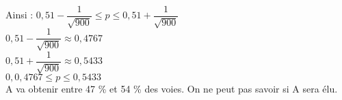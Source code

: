 Ainsi : $ 0,51 - \dfrac{1}{\sqrt{900}} \leq p \leq 0,51 + \dfrac{1}{\sqrt{900}} $ \\

$ 0,51 - \dfrac{1}{\sqrt{900}} \approx 0,4767 $ \\

$ 0,51 + \dfrac{1}{\sqrt{900}} \approx 0,5433 $ \\

$ 0,0,4767 \leq p \leq 0,5433 $ \\

A va obtenir entre 47  \% et 54  \% des voies. On ne peut pas savoir si A sera élu.

\ifdefined\COMPLETE
\else
    
\fi